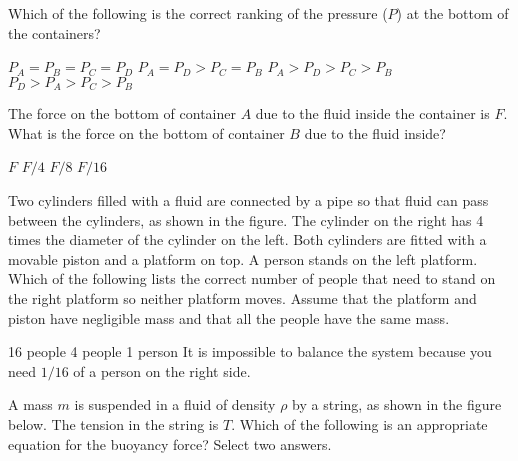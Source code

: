 \documentclass{../../../oss-ap12ibhl-print}
\begin{document}
\begin{questions}
    
  \question Which of the following is the correct ranking of the pressure ($P$)
  at the bottom of the containers?
  \label{cyl1}
  \begin{choices}
    \choice $P_A = P_B = P_C = P_D$
    \choice $P_A = P_D > P_C = P_B$
    \choice $P_A > P_D > P_C > P_B$
    \choice $P_D > P_A > P_C > P_B$
  \end{choices}
    
  \question The force on the bottom of container $A$ due to the fluid inside the
  container is $F$. What is the force on the bottom of container $B$ due to
  the fluid inside?
  \label{cyl2}
  \begin{choices}
    \choice $F$
    \choice $F/4$
    \choice $F/8$
    \choice $F/16$
  \end{choices}

  \question Two cylinders filled with a fluid are connected by a pipe so that
  fluid can pass between the cylinders, as shown in the figure. The cylinder on
  the right has 4 times the diameter of the cylinder on the left. Both cylinders
  are fitted with a movable piston and a platform on top. A person stands on
  the left platform. Which of the following lists the correct number of people
  that need to stand on the right platform so neither platform moves. Assume
  that the platform and piston have negligible mass and that all the people
  have the same mass.

  \begin{minipage}{.4\textwidth}
  \end{minipage}
  \begin{minipage}{.58\textwidth}
    \begin{choices}
      \choice \num{16} people
      \choice \num{4} people
      \choice \num{1} person
      \choice It is impossible to balance the system because you need $1/16$ of
      a person on the right side.
    \end{choices}
  \end{minipage}
    
  \question A mass $m$ is suspended in a fluid of density $\rho$ by a string, as
  shown in the figure below. The tension in the string is $T$. Which of the
  following is an appropriate equation for the buoyancy force? Select two
  answers.
  

\end{questions}
\end{document}
